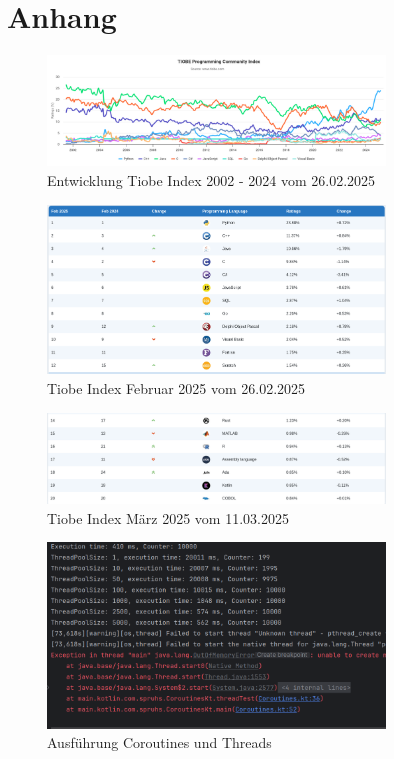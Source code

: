 \documentclass[11pt]{article}
\begin{document}
    \printbibliography[
        heading=bibintoc,
        title={Literaturverzeichnis}
    ]
    \appendix
    \section{Anhang}

    \begin{figure}[h]
        \centering
        \includegraphics[width=0.8\textwidth]{pictures/Screenshot 2025-02-26 at 19-53-49 TIOBE Index - TIOBE}
        \caption{Entwicklung Tiobe Index 2002 - 2024 vom 26.02.2025 }
        \label{fig:entwicklung-tiobe}
    \end{figure}

    \begin{figure}[h]
        \centering
        \includegraphics[width=0.8\textwidth]{pictures/Screenshot 2025-02-26 at 19-54-42 TIOBE Index - TIOBE}
        \caption{Tiobe Index Februar 2025 vom 26.02.2025}
        \label{fig:tiobe-java-2025}
    \end{figure}

    \begin{figure}[h]
        \centering
        \includegraphics[width=0.8\textwidth]{pictures/Screenshot 2025-03-11 at 22-21-04 TIOBE Index - TIOBE}
        \caption{Tiobe Index März 2025 vom 11.03.2025}
        \label{fig:tiobe-kotlin-2025}
    \end{figure}

    \begin{figure}[h]
        \centering
        \includegraphics[width=0.8\textwidth]{pictures/Bildschirmfoto vom 2025-04-08 20-09-18}
        \caption{Ausführung Coroutines und Threads}
        \label{fig:coroutines-threads}
    \end{figure}
\end{document}
